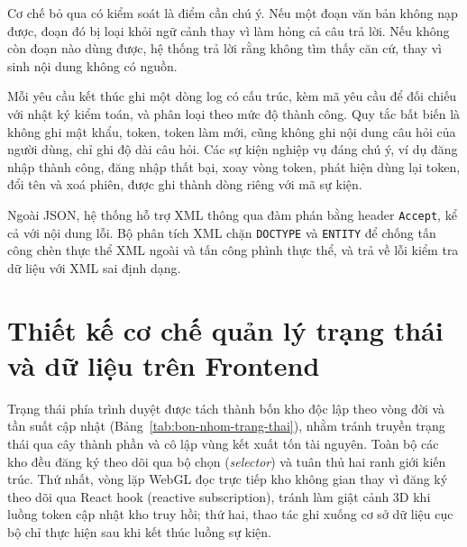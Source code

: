 Cơ chế bỏ qua có kiểm soát là điểm cần chú ý. Nếu một đoạn văn bản không nạp được, đoạn đó bị loại khỏi ngữ cảnh thay vì làm hỏng cả câu trả lời. Nếu không còn đoạn nào dùng được, hệ thống trả lời rằng không tìm thấy căn cứ, thay vì sinh nội dung không có nguồn.

Mỗi yêu cầu kết thúc ghi một dòng log có cấu trúc, kèm mã yêu cầu để đối chiếu với nhật ký kiểm toán, và phân loại theo mức độ thành công. Quy tắc bất biến là không ghi mật khẩu, token, token làm mới, cũng không ghi nội dung câu hỏi của người dùng, chỉ ghi độ dài câu hỏi. Các sự kiện nghiệp vụ đáng chú ý, ví dụ đăng nhập thành công, đăng nhập thất bại, xoay vòng token, phát hiện dùng lại token, đổi tên và xoá phiên, được ghi thành dòng riêng với mã sự kiện.

Ngoài JSON, hệ thống hỗ trợ XML thông qua đàm phán bằng header \texttt{Accept}, kể cả với nội dung lỗi. Bộ phân tích XML chặn \texttt{DOCTYPE} và \texttt{ENTITY} để chống tấn công chèn thực thể XML ngoài và tấn công phình thực thể, và trả về lỗi kiểm tra dữ liệu với XML sai định dạng.

\section{Thiết kế cơ chế quản lý trạng thái và dữ liệu trên Frontend}
\label{sec:state-management}

Trạng thái phía trình duyệt được tách thành bốn kho độc lập theo vòng đời và tần suất cập nhật (Bảng~\ref{tab:bon-nhom-trang-thai}), nhằm tránh truyền trạng thái qua cây thành phần và cô lập vùng kết xuất tốn tài nguyên. Toàn bộ các kho đều đăng ký theo dõi qua bộ chọn (\textit{selector}) và tuân thủ hai ranh giới kiến trúc. Thứ nhất, vòng lặp WebGL đọc trực tiếp kho không gian thay vì đăng ký theo dõi qua React hook (reactive subscription), tránh làm giật cảnh 3D khi luồng token cập nhật kho truy hồi; thứ hai, thao tác ghi xuống cơ sở dữ liệu cục bộ chỉ thực hiện sau khi kết thúc luồng sự kiện.

